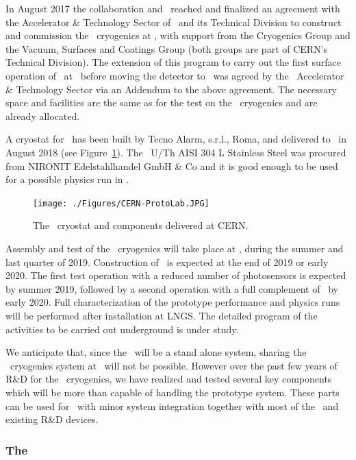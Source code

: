 In August 2017 the collaboration and \LNGS\ reached and finalized an agreement \cite{Mapelli:2017vn} with the Accelerator \& Technology Sector of \CERN\ and its Technical Division to construct and commission the \DSks\ cryogenics at \CERN, with support from the Cryogenics Group and the Vacuum, Surfaces and Coatings Group (both groups are part of CERN's Technical Division). The extension of this program to carry out the first surface operation of \DSps\ at \CERN\ before moving the detector to \LNGS\ was agreed by the \CERN\ Accelerator \& Technology Sector via an Addendum to the above agreement. The necessary space and facilities are the same as for the test on the \DSk\ cryogenics and are already allocated.

A cryostat for \DSps\ has been built by Tecno Alarm, s.r.l., Roma, and delivered to \CERN\ in August 2018 (see Figure~\ref{fig:proto-cern}).  The \DSlCryostatUCont\ U/Th AISI 304 L Stainless Steel was procured from NIRONIT Edelstahlhandel GmbH \& Co and it is good enough to be used for a possible physics run in \LNGS.

\begin{figure}[!t]
\centering
\texttt{[image: ./Figures/CERN-ProtoLab.JPG]}
\caption[The \DSps\ cryostat and components delivered at CERN]{The \DSps\ cryostat and components delivered at CERN.}
\label{fig:proto-cern}
\end{figure}

Assembly and test of the \DSks\ cryogenics will take place at \CERN, during the summer and last quarter of 2019. Construction of \DSps\ is expected at the end of 2019 or early 2020. The first test operation with a reduced number of photosensors is expected by summer 2019, followed by a second operation with a full complement of \DSkPdms\ by early 2020. Full characterization of the prototype performance and physics runs will be performed after installation at LNGS. The detailed program of the activities to be carried out underground is under study.

We anticipate that, since the \DSps\ will be a stand alone system, sharing the \DSks\ cryogenics system at \LNGS\ will not be possible. However over the past few years of R\&D for the \DSks\ cryogenics, we have realized and tested several key components which will be more than capable of handling the prototype system. These parts can be used for \DSps\ with minor system integration together with most of the \DSfs\ and existing R\&D devices.

\subsubsection{The \DSps\ \TPC}


